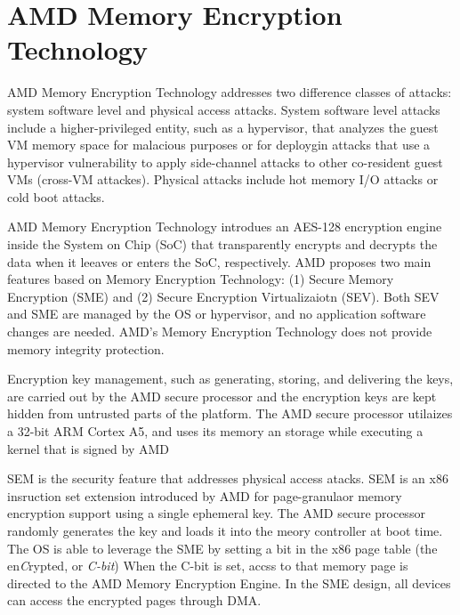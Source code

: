 \section{AMD Memory Encryption Technology}

%
%


AMD Memory Encryption Technology addresses two difference classes of attacks:
system software level and physical access attacks.  
%
System software level attacks include a higher-privileged entity, such as a
hypervisor, that analyzes the guest VM memory space for malacious purposes or
for deploygin attacks that use a hypervisor vulnerability to apply side-channel
attacks to other co-resident guest VMs (cross-VM attackes).
%
Physical attacks include hot memory I/O attacks or cold boot attacks.


AMD Memory Encryption Technology introdues an AES-128 encryption engine inside
the System on Chip (SoC) that transparently encrypts and decrypts the data
when it leeaves or enters the SoC, respectively.
%
AMD proposes two main features based on Memory Encryption Technology: (1)
Secure Memory Encryption (SME) and (2) Secure Encryption Virtualizaiotn (SEV).
%
Both SEV and SME are managed by the OS or hypervisor, and no application software
changes are needed.
%
AMD's Memory Encryption Technology does not provide memory integrity
protection.


Encryption key management, such as generating, storing, and delivering the
keys, are carried out by the AMD secure processor and the encryption keys are kept
hidden from untrusted parts of the platform.
%
The AMD secure processor utilaizes a 32-bit ARM Cortex A5, and uses its memory
an storage while executing a kernel that is signed by AMD


SEM is the security feature that addresses physical access atacks.
%
SEM is an x86 insruction set extension introduced by AMD for page-granulaor
memory encryption support using a single ephemeral key.
%
The AMD secure processor randomly generates the key
and loads it into the meory controller at boot time.
%
The OS is able to leverage the SME by setting a bit in the x86 page table (the
en\emph{C}rypted, or \emph{C-bit})
%
When the C-bit is set, accss to that memory page is directed to the AMD Memory
Encryption Engine.
%
In the SME design, all devices can access the encrypted pages through DMA.


